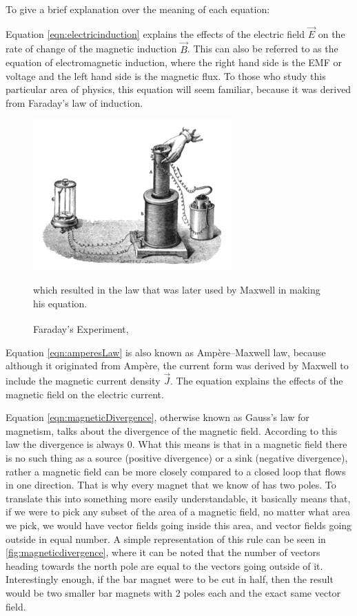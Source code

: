 To give a brief explanation over the meaning of each equation:

Equation \ref{eqn:electricinduction} explains the effects of the electric field $\vec{E}$ on the rate of change of the magnetic induction $\vec{B}$. This can also be referred to as the equation of electromagnetic induction, where the right hand side is the EMF or voltage and the left hand side is the magnetic flux. To those who study this particular area of physics, this equation will seem familiar, because it was derived from Faraday's law of induction.

\begin{figure}
	\centering
	\includegraphics{Figures/faradayexp}
	\decoRule
	\caption[Faraday's Experiment]{Faraday's Experiment,\textsuperscript{\cite{poyser1918magnetism}}} which resulted in the law that was later used by Maxwell in making his equation.
	\label{fig:faradayexp}
\end{figure}

Equation \ref{eqn:amperesLaw} is also known as Ampère–Maxwell law, because although it originated from Ampère, the current form was derived by Maxwell to include the magnetic current density $\vec{J}$. The equation explains the effects of the magnetic field on the electric current.

Equation \ref{eqn:magneticDivergence}, otherwise known as Gauss's law for magnetism, talks about the divergence of the magnetic field. According to this law the divergence is always 0. What this means is that in a magnetic field there is no such thing as a source (positive divergence) or a sink (negative divergence), rather a magnetic field can be more closely compared to a closed loop that flows in one direction. That is why every magnet that we know of has two poles. To translate this into something more easily understandable, it basically means that, if we were to pick any subset of the area of a magnetic field, no matter what area we pick, we would have vector fields going inside this area, and vector fields going outside in equal number. A simple representation of this rule can be seen in \ref{fig:magneticdivergence}, where it can be noted that the number of vectors heading towards the north pole are equal to the vectors going outside of it. Interestingly enough, if the bar magnet were to be cut in half, then the result would be two smaller bar magnets with 2 poles each and the exact same vector field.

